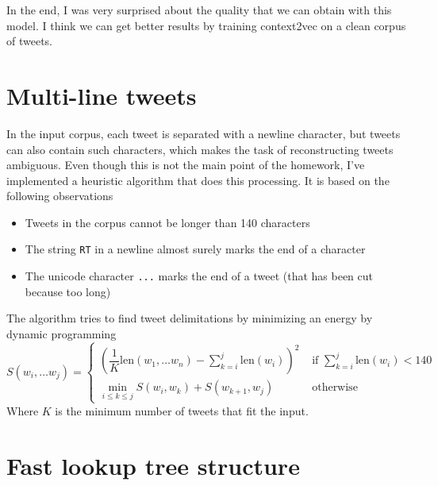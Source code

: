 \documentclass[a4paper, 11pt]{article}
\begin{document}
In the end, I was very surprised about the quality that we can obtain
with this  model. I think we can get better
results by training context2vec on a clean corpus of tweets.

\appendix
\newpage
\section{Multi-line tweets}
\label{sec:multi-line-tweets}

In the input corpus, each tweet is separated with a newline character,
but tweets can also contain such characters, which makes the task of
reconstructing tweets ambiguous. Even though this is not the main
point of the homework, I've implemented a heuristic algorithm that
does this processing. It is based on the following observations
\begin{itemize}
\item Tweets in the corpus cannot be longer than 140 characters
\item The string \verb+RT+ in a newline almost surely marks the end of
  a character
\item The unicode character \verb+...+ marks the end of a tweet (that
  has been cut because too long)
\end{itemize}
The algorithm tries to find tweet delimitations by minimizing an
energy by dynamic programming
\begin{displaymath}
  S(w_i, \dots w_j) = \left\{
    \begin{array}{ll}
      \left(\dfrac{1}{K}\text{len}(w_1, \dots w_n) - \sum_{k = i}^j \text{len}(w_i)\right)^2 & \text{ if } \sum_{k = i}^j \text{len}(w_i) < 140 \\
      \min_{i \le k \le j} S(w_i, w_k) + S(w_{k+1}, w_j) & \text{ otherwise }
    \end{array}
  \right.
\end{displaymath}
Where $K$ is the minimum number of tweets that fit the input.

\newpage
\section{Fast lookup tree structure}
\label{sec:fast-lookup-tree-structure}
\end{document}
